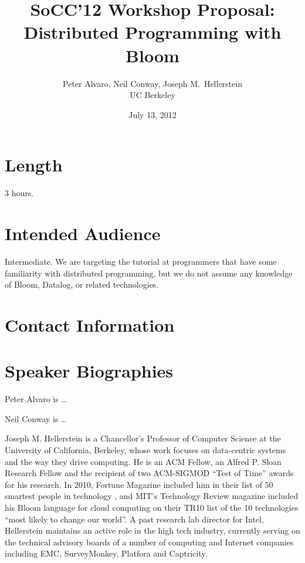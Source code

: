 \documentclass[11pt]{article}
\title{SoCC'12 Workshop Proposal:\\Distributed Programming with Bloom}
\author{Peter Alvaro, Neil Conway, Joseph M.\ Hellerstein\\UC Berkeley}
\date{July 13, 2012}
\begin{document}
\maketitle

\section*{Length}

3 hours.

\section*{Intended Audience}

Intermediate. We are targeting the tutorial at programmers that have some
familiarity with distributed programming, but we do not assume any knowledge of
Bloom, Datalog, or related technologies.

\section*{Contact Information}

\section*{Speaker Biographies}

Peter Alvaro is \ldots

Neil Conway is \ldots

Joseph M. Hellerstein is a Chancellor's Professor of Computer Science at the
University of California, Berkeley, whose work focuses on data-centric systems
and the way they drive computing. He is an ACM Fellow, an Alfred P. Sloan
Research Fellow and the recipient of two ACM-SIGMOD ``Test of Time'' awards for
his research. In 2010, Fortune Magazine included him in their list of 50
smartest people in technology , and MIT's Technology Review magazine included
his Bloom language for cloud computing on their TR10 list of the 10 technologies
``most likely to change our world''. A past research lab director for Intel,
Hellerstein maintains an active role in the high tech industry, currently
serving on the technical advisory boards of a number of computing and Internet
companies including EMC, SurveyMonkey, Platfora and Captricity.
\end{document}
